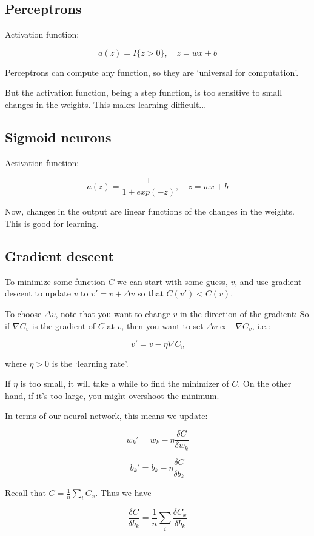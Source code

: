 \documentclass[12pt]{article}
\begin{document}
\subsection*{Perceptrons}

Activation function:

$$a(z) = I\{z > 0\}, \quad z = wx + b $$

Perceptrons can compute any function, so they are `universal for computation'.

But the activation function, being a step function, is too sensitive to small changes in the weights. This makes learning difficult...

\subsection*{Sigmoid neurons}

Activation function:

$$a(z) = \frac{1}{1 + exp(-z)}, \quad z = wx + b $$

Now, changes in the output are linear functions of the changes in the weights. This is good for learning.

\subsection*{Gradient descent}

To minimize some function $C$ we can start with some guess, $v$, and use gradient descent to update $v$ to $v' = v + \Delta v$ so that $C(v') < C(v)$.

To choose $\Delta v$, note that you want to change $v$ in the direction of the gradient: So if $\nabla C_v$ is the gradient of $C$ at $v$, then you want to set $\Delta v \propto -\nabla C_v$, i.e.:

$$v' = v - \eta \nabla C_v$$

where $\eta > 0$ is the `learning rate'.

If $\eta$ is too small, it will take a while to find the minimizer of $C$. On the other hand, if it's too large, you might overshoot the minimum.

In terms of our neural network, this means we update:

$$ w_k' = w_k - \eta \frac{\delta C}{\delta w_k}$$

$$ b_k' = b_k - \eta \frac{\delta C}{\delta b_k}$$

Recall that $C = \frac{1}{n} \sum_i C_x$. Thus we have

$$\frac{\delta C}{\delta b_k} = \frac{1}{n} \sum_i \frac{\delta C_x}{\delta b_k}$$
\end{document}

